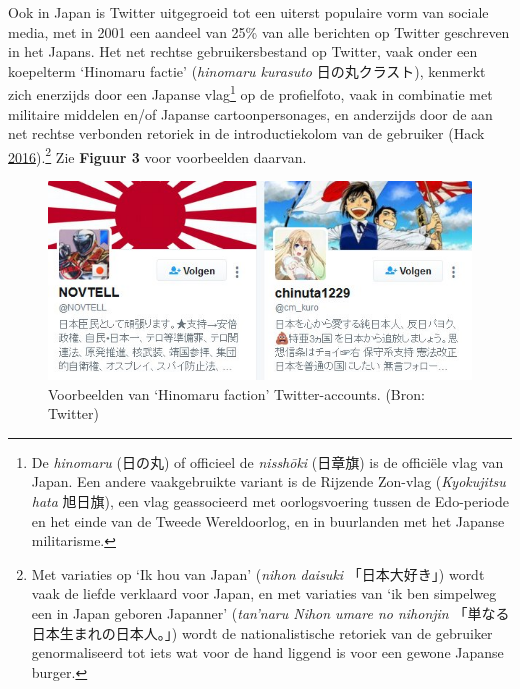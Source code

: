\documentclass[10.5pt,dutch,]{article}
\begin{document}
Ook in Japan is Twitter uitgegroeid tot een uiterst populaire vorm van
sociale media, met in 2001 een aandeel van 25\% van alle berichten op
Twitter geschreven in het Japans. Het net rechtse gebruikersbestand op
Twitter, vaak onder een koepelterm `Hinomaru factie' (\emph{hinomaru
kurasuto} 日の丸クラスト), kenmerkt zich enerzijds door een Japanse
vlag\footnote{De \emph{hinomaru} (日の丸) of officieel de
  \emph{nisshōki} (日章旗) is de officiële vlag van Japan. Een andere
  vaakgebruikte variant is de Rijzende Zon-vlag (\emph{Kyokujitsu hata}
  旭日旗), een vlag geassocieerd met oorlogsvoering tussen de
  Edo-periode en het einde van de Tweede Wereldoorlog, en in buurlanden
  met het Japanse militarisme.} op de profielfoto, vaak in combinatie
met militaire middelen en/of Japanse cartoonpersonages, en anderzijds
door de aan net rechtse verbonden retoriek in de introductiekolom van de
gebruiker (Hack
\protect\hyperlink{ref-hackux5fsubcultureux5f2016}{2016}).\footnote{Met
  variaties op `Ik hou van Japan' (\emph{nihon daisuki} 「日本大好き」)
  wordt vaak de liefde verklaard voor Japan, en met variaties van `ik
  ben simpelweg een in Japan geboren Japanner' (\emph{tan'naru Nihon
  umare no nihonjin} 「単なる日本生まれの日本人。」) wordt de
  nationalistische retoriek van de gebruiker genormaliseerd tot iets wat
  voor de hand liggend is voor een gewone Japanse burger.} Zie
\textbf{Figuur 3} voor voorbeelden daarvan.

\begin{figure}[htbp]
\centering
\includegraphics{images/twitter_hinomaru_crest.jpg}
\caption{Voorbeelden van `Hinomaru faction' Twitter-accounts. (Bron:
Twitter)}
\end{figure}
\end{document}
